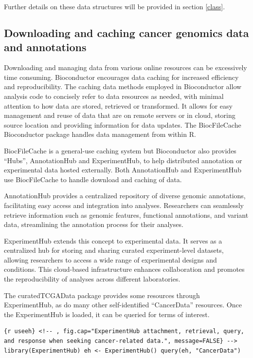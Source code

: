Further details on these data structures will be provided in section \ref{class}.

\hypertarget{cache}{%
\subsection{Downloading and caching cancer genomics data and annotations}\label{cache}}

Downloading and managing data from various online resources
can be excessively time consuming. Bioconductor encourages data caching for
increased efficiency and reproducibility. The caching data methods
employed in Bioconductor
allow analysis code to
concisely refer to data resources as needed, with minimal attention to how
data are stored, retrieved or transformed.
It allows for easy management and reuse of data that are on remote
servers or in cloud, storing source
location and providing information for data updates. The BiocFileCache
Bioconductor package handles data management from within R.

BiocFileCache is a general-use caching system but Bioconductor also provides
``Hubs'', AnnotationHub and ExperimentHub, to help distributed annotation or
experimental data hosted externally. Both AnnotationHub and ExperimentHub use
BiocFileCache to handle download and caching of data.

AnnotationHub provides a centralized repository of diverse genomic annotations,
facilitating easy access and integration into analyses. Researchers can
seamlessly retrieve information such as genomic features, functional
annotations, and variant data, streamlining the annotation process for their
analyses.

ExperimentHub extends this concept to experimental data. It serves as a
centralized hub for storing and sharing curated experiment-level datasets,
allowing researchers to access a wide range of experimental designs and
conditions. This cloud-based infrastructure enhances collaboration and promotes
the reproducibility of analyses across different laboratories.

The curatedTCGAData package provides some resources through
ExperimentHub, as do many other self-identified ``CancerData'' resources. Once the
ExperimentHub is loaded, it can be queried for terms of interest.

\texttt{\{r useeh\} \textless{}!-\/- , fig.cap="ExperimentHub attachment, retrieval, query, and response when seeking cancer-related data.", message=FALSE\} -\/-\textgreater{} library(ExperimentHub) eh \textless{}- ExperimentHub() query(eh, "CancerData")}

